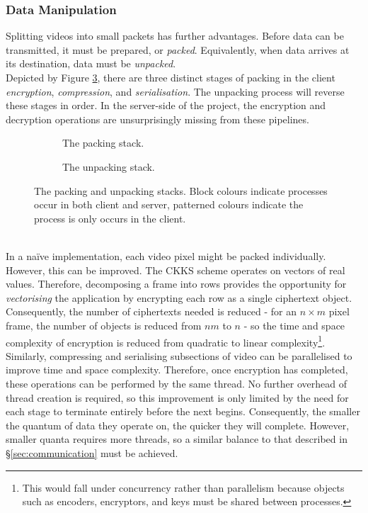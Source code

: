 \setlength{\leftskip}{0cm}
\subsubsection{Data Manipulation}
\setlength{\leftskip}{0.5cm}
\indent \indent
Splitting videos into small packets has further advantages. Before data can be transmitted, it must be prepared, or \textit{packed}. Equivalently, when data arrives at its destination, data must be \textit{unpacked}.
\smallskip \\ \indent
Depicted by Figure \ref{fig:packingAndUnpacking}, there are three distinct stages of packing in the client \textit{encryption}, \textit{compression}, and \textit{serialisation}. The unpacking process will reverse these stages in order. In the server-side of the project, the encryption and decryption operations are unsurprisingly missing from these pipelines.
\begin{figure}[htp]
    \begin{subfigure}[b]{0.5\textwidth}
        \centering
        \scalebox{0.8}{}
        \caption{The packing stack.}
        \label{fig:packing}
    \end{subfigure}%
    \begin{subfigure}[b]{0.5\textwidth}
        \centering
        \scalebox{0.8}{}
        \caption{The unpacking stack.}
        \label{fig:unpacking}
    \end{subfigure}%
    \caption[Packing and Unpacking]{The packing and unpacking stacks. Block colours indicate processes occur in both client and server, patterned colours indicate the process is only occurs in the client.}
    \label{fig:packingAndUnpacking}
\end{figure}
\smallskip \\ \indent
In a na\"ive implementation, each video pixel might be packed individually. However, this can be improved. The CKKS scheme operates on vectors of real values. Therefore, decomposing a frame into rows provides the opportunity for \textit{vectorising} the application by encrypting each row as a single ciphertext object. Consequently, the number of ciphertexts needed is reduced - for an $n \times m$ pixel frame, the number of objects is reduced from $nm$ to $n$ - so the time and space complexity of encryption is reduced from quadratic to linear complexity\footnote{This would fall under concurrency rather than parallelism because objects such as encoders, encryptors, and keys must be shared between processes.}.
\smallskip \\ \indent
Similarly, compressing and serialising subsections of video can be parallelised to improve time and space complexity. Therefore, once encryption has completed, these operations can be performed by the same thread. No further overhead of thread creation is required, so this improvement is only limited by the need for each stage to terminate entirely before the next begins. Consequently, the smaller the quantum of data they operate on, the quicker they will complete. However, smaller quanta requires more threads, so a similar balance to that described in §\ref{sec:communication} must be achieved.

